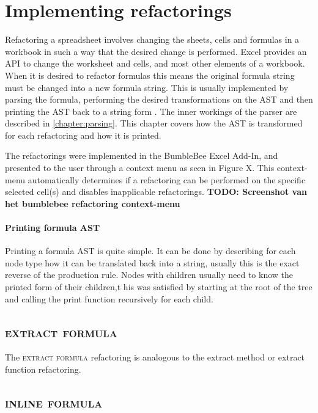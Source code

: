\documentclass[12pt,a4paper,onecolumn,oneside,parskip]{memoir}
\newcommand{\todo}[1]{\textbf{TODO: #1}}
\newcommand{\rf}[1]{\textsc{\lowercase{#1}}}
\begin{document}
\chapter{Implementing refactorings}
\label{chapter:implementingrefactorings}

Refactoring a spreadsheet involves changing the sheets, cells and formulas in a workbook in such a way that the desired change is performed.
Excel provides an API to change the worksheet and cells, and most other elements of a workbook.
When it is desired to refactor formulas this means the original formula string must be changed into a new formula string.
This is usually implemented by parsing the formula, performing the desired transformations on the AST and then printing the AST back to a string form \cite{fowler1999refactoring}.
The inner workings of the parser are described in \ref{chapter:parsing}.
This chapter covers how the AST is transformed for each refactoring and how it is printed.

The refactorings were implemented in the BumbleBee Excel Add-In, and presented to the user through a context menu as seen in Figure X.
This context-menu automatically determines if a refactoring can be performed on the specific selected cell(s) and disables inapplicable refactorings.
\todo{Screenshot van het bumblebee refactoring context-menu}

\subsubsection{Printing formula AST}

Printing a formula AST is quite simple.
It can be done by describing for each node type how it can be translated back into a string, usually this is the exact reverse of the production rule.
Nodes with children usually need to know the printed form of their children,t his was satisfied by starting at the root of the tree and calling the print function recursively for each child.

\section{\rf{Extract formula}}

The \rf{extract formula} refactoring is analogous to the extract method or extract function refactoring.

\section{\rf{Inline formula}}
\end{document}
